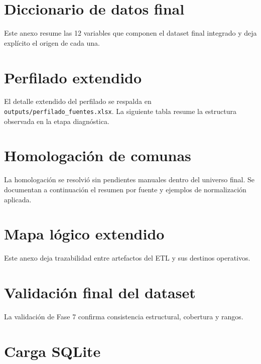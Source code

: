 \appendix

\chapter{Diccionario de datos final}

Este anexo resume las 12 variables que componen el dataset final integrado y deja explícito el origen de cada una.



\chapter{Perfilado extendido}

El detalle extendido del perfilado se respalda en \texttt{outputs/perfilado\_fuentes.xlsx}. La siguiente tabla resume la estructura observada en la etapa diagnóstica.



\chapter{Homologación de comunas}

La homologación se resolvió sin pendientes manuales dentro del universo final. Se documentan a continuación el resumen por fuente y ejemplos de normalización aplicada.





\chapter{Mapa lógico extendido}

Este anexo deja trazabilidad entre artefactos del ETL y sus destinos operativos.



\chapter{Validación final del dataset}

La validación de Fase 7 confirma consistencia estructural, cobertura y rangos.



\chapter{Carga SQLite}


